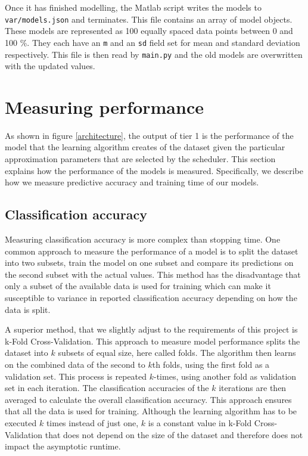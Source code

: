 \documentclass[a4paper,12pt,twoside,openright]{report}
\begin{document}
Once it has finished modelling, the Matlab script writes the models to \texttt{var/models.json} and terminates. This file contains an array of model objects. These models are represented as 100 equally spaced data points between 0 and 100 \%. They each have an \texttt{m} and an \texttt{sd} field set for mean and standard deviation respectively. This file is then read by \texttt{main.py} and the old models are overwritten with the updated values.


\section{Measuring performance}
As shown in figure \ref{architecture}, the output of tier 1 is the performance of the model that the learning algorithm creates of the dataset given the particular approximation parameters that are selected by the scheduler. This section explains how the performance of the models is measured. Specifically, we describe how we measure predictive accuracy and training time of our models.

\subsection{Classification accuracy}

Measuring classification accuracy is more complex than stopping time. One common approach to measure the performance of a model is to split the dataset into two subsets, train the model on one subset and compare its predictions on the second subset with the actual values. This method has the disadvantage that only a subset of the available data is used for training which can make it susceptible to variance in reported classification accuracy depending on how the data is split.

A superior method, that we slightly adjust to the requirements of this project is k-Fold Cross-Validation. This approach to measure model performance splits the dataset into $k$ subsets of equal size, here called folds. The algorithm then learns on the combined data of the second to $k$th folds, using the first fold as a validation set. This process is repeated $k$-times, using another fold as validation set in each iteration. The classification accuracies of the $k$ iterations are then averaged to calculate the overall classification accuracy. This approach ensures that all the data is used for training. Although the learning algorithm has to be executed $k$ times instead of just one, $k$ is a constant value in k-Fold Cross-Validation that does not depend on the size of the dataset and therefore does not impact the asymptotic runtime.
\end{document}
